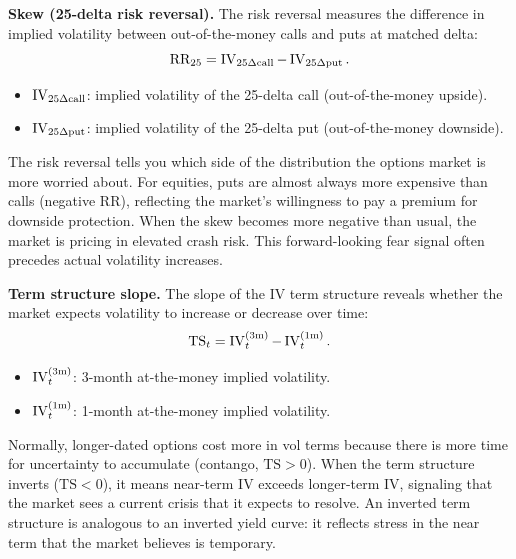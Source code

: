 \textbf{Skew (25-delta risk reversal).}
The risk reversal measures the difference in implied volatility between out-of-the-money calls and puts at matched delta:
\begin{equation}\label{eq:rr}
\text{RR}_{25} = \operatorname{IV}_{25\Delta\text{call}} - \operatorname{IV}_{25\Delta\text{put}}.
\end{equation}
\begin{itemize}[nosep]
  \item $\operatorname{IV}_{25\Delta\text{call}}$: implied volatility of the 25-delta call (out-of-the-money upside).
  \item $\operatorname{IV}_{25\Delta\text{put}}$: implied volatility of the 25-delta put (out-of-the-money downside).
\end{itemize}

\begin{intuition}
The risk reversal tells you which side of the distribution the options market is more worried about. For equities, puts are almost always more expensive than calls (negative RR), reflecting the market's willingness to pay a premium for downside protection. When the skew becomes more negative than usual, the market is pricing in elevated crash risk. This forward-looking fear signal often precedes actual volatility increases.
\end{intuition}

\textbf{Term structure slope.}
The slope of the IV term structure reveals whether the market expects volatility to increase or decrease over time:
\begin{equation}\label{eq:ts-slope}
\text{TS}_t = \operatorname{IV}_t^{(3\text{m})} - \operatorname{IV}_t^{(1\text{m})}.
\end{equation}
\begin{itemize}[nosep]
  \item $\operatorname{IV}_t^{(3\text{m})}$: 3-month at-the-money implied volatility.
  \item $\operatorname{IV}_t^{(1\text{m})}$: 1-month at-the-money implied volatility.
\end{itemize}

\begin{intuition}
Normally, longer-dated options cost more in vol terms because there is more time for uncertainty to accumulate (contango, $\text{TS} > 0$). When the term structure inverts ($\text{TS} < 0$), it means near-term IV exceeds longer-term IV, signaling that the market sees a current crisis that it expects to resolve. An inverted term structure is analogous to an inverted yield curve: it reflects stress in the near term that the market believes is temporary.
\end{intuition}

